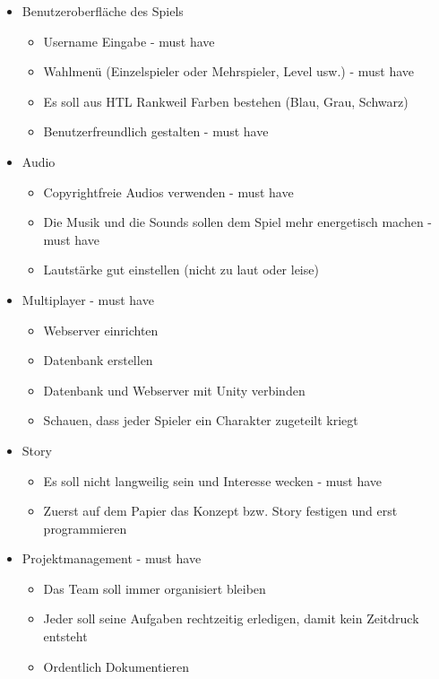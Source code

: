 \begin{itemize}
\item
  Benutzeroberfläche des Spiels

  \begin{itemize}
  \item
    Username Eingabe - must have
  \item
    Wahlmenü (Einzelspieler oder Mehrspieler, Level usw.) - must have
  \item
    Es soll aus HTL Rankweil Farben bestehen (Blau, Grau, Schwarz)
  \item
    Benutzerfreundlich gestalten - must have
  \end{itemize}
\item
  Audio

  \begin{itemize}
  \item
    Copyrightfreie Audios verwenden - must have 
  \item
    Die Musik und die Sounds sollen dem Spiel mehr energetisch machen -
    must have
  \item
    Lautstärke gut einstellen (nicht zu laut oder leise)
  \end{itemize}
\item
  Multiplayer - must have

  \begin{itemize}
  \item
    Webserver einrichten 
  \item
    Datenbank erstellen
  \item
    Datenbank und Webserver mit Unity verbinden
  \item
    Schauen, dass jeder Spieler ein Charakter zugeteilt kriegt
  \end{itemize}
\item
  Story

  \begin{itemize}
  \item
    Es soll nicht langweilig sein und Interesse wecken - must have
  \item
    Zuerst auf dem Papier das Konzept bzw. Story festigen und erst
    programmieren
  \end{itemize}
\item
  Projektmanagement - must have

  \begin{itemize}
  \item
    Das Team soll immer organisiert bleiben
  \item
    Jeder soll seine Aufgaben rechtzeitig erledigen, damit kein
    Zeitdruck entsteht
  \item
    Ordentlich Dokumentieren
  \end{itemize}
\end{itemize}

